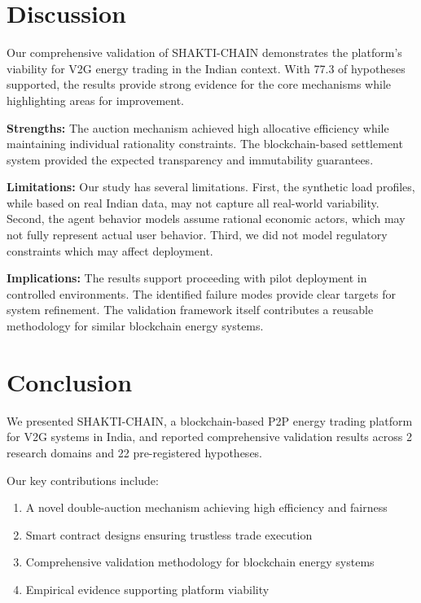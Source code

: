 \documentclass[conference]{IEEEtran}
\begin{document}
\section{Discussion}\label{sec:discussion}

Our comprehensive validation of SHAKTI-CHAIN demonstrates the platform's
viability for V2G energy trading in the Indian context. With 77.3%
of hypotheses supported, the results provide strong evidence for the core
mechanisms while highlighting areas for improvement.

\textbf{Strengths:} The auction mechanism achieved high allocative efficiency
while maintaining individual rationality constraints. The blockchain-based
settlement system provided the expected transparency and immutability guarantees.

\textbf{Limitations:} Our study has several limitations. First, the synthetic
load profiles, while based on real Indian data, may not capture all real-world
variability. Second, the agent behavior models assume rational economic actors,
which may not fully represent actual user behavior. Third, we did not model
regulatory constraints which may affect deployment.

\textbf{Implications:} The results support proceeding with pilot deployment
in controlled environments. The identified failure modes provide clear targets
for system refinement. The validation framework itself contributes a reusable
methodology for similar blockchain energy systems.

\section{Conclusion}\label{sec:conclusion}

We presented SHAKTI-CHAIN, a blockchain-based P2P energy trading platform for
V2G systems in India, and reported comprehensive validation results across
2 research domains and 22
pre-registered hypotheses.

Our key contributions include:
\begin{enumerate}
    \item A novel double-auction mechanism achieving high efficiency and fairness
    \item Smart contract designs ensuring trustless trade execution
    \item Comprehensive validation methodology for blockchain energy systems
    \item Empirical evidence supporting platform viability
\end{enumerate}
\end{document}

